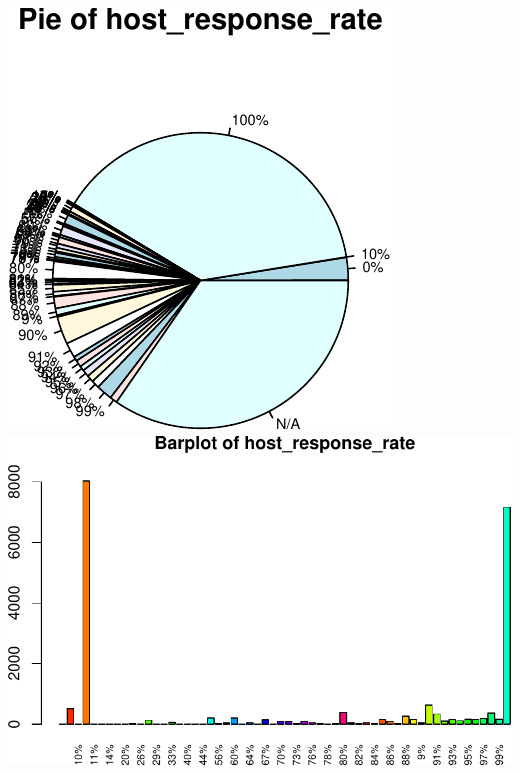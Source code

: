 \includegraphics{anal_files/figure-latex/unnamed-chunk-7-4.pdf}
\includegraphics{anal_files/figure-latex/unnamed-chunk-7-5.pdf}

